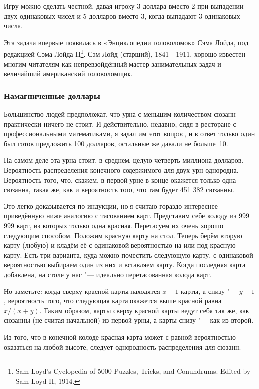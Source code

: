 \documentclass[twoside]{book}
\begin{document}
\medskip

Игру можно сделать честной, давая игроку 3 доллара вместо 2 при выпадении двух одинаковых чисел 
и 5 долларов вместо 3, когда выпадают 3 одинаковых числа.

\medskip

Эта задача впервые появилась в «Энциклопедии головоломок» Сэма Лойда, под редакцией Сэма Лойда II\footnote{{Sam Loyd’s Cyclopedia of 5000 Puzzles, Tricks, and Conundrums.} Edited by Sam Loyd II, 1914.}.
Сэм Лойд (старший), 1841---1911, хорошо известен многим читателям как непревзойдённый мастер занимательных задач и величайший американский головоломщик.

\subsubsection*{Намагниченные доллары}%

Большинство людей предположат, что урна с меньшим количеством сюзанн практически ничего не стоит.
И действительно, недавно, сидя в ресторане с профессиональными математиками, я задал им этот вопрос, и в ответ только один был готов предложить 100 долларов, остальные же давали не больше~10.

На самом деле эта урна стоит, в среднем, целую четверть миллиона долларов.
Вероятность распределения конечного содержимого для двух урн однородна.
Вероятность того, что, скажем, в первой урне в конце окажется только одна сюзанна, такая же, как и вероятность того, что там будет 451 382 сюзанны.

Это легко доказывается по индукции, но я считаю гораздо интереснее приведённую ниже аналогию с тасованием карт.
Представим себе колоду из 
999 999 
карт, из которых только одна красная.
Перетасуем их очень хорошо следующим способом.
Положим красную карту на стол.
Теперь берём вторую карту (любую) и кладём её с одинаковой вероятностью на или под красную карту.
Есть три варианта, куда можно поместить следующую карту, с одинаковой вероятностью выбираем один из них и вставляем карту.
Когда последняя карта добавлена, на столе у нас "--- идеально перетасованная колода карт.

Но заметьте: когда сверху красной карты находятся $x-1$ карты, а снизу "--- $y-1$, вероятность того, что следующая карта окажется выше красной равна $x/(x+y)$.
Таким образом, карты сверху красной карты ведут себя так же, как сюзанны (не считая начальной) из первой урны, а карты снизу "--- как из второй.

Из того, что в конечной колоде красная карта может с равной вероятностью оказаться на любой высоте, следует однородность распределения для сюзанн.\heart
 
\end{document}
